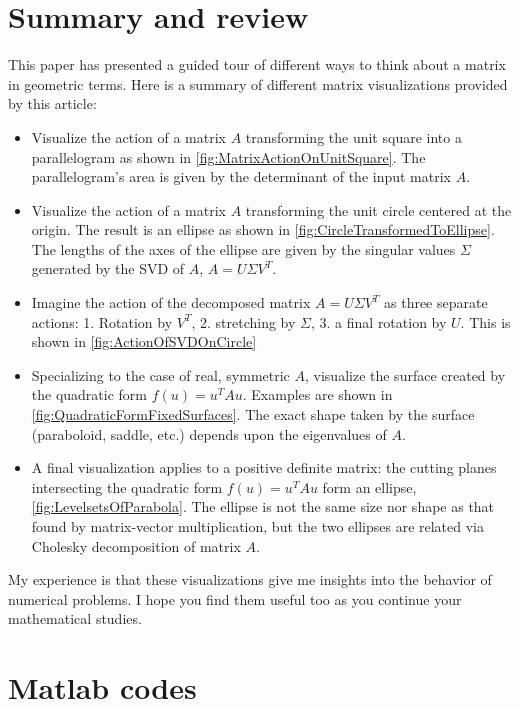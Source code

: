 \documentclass[onefignum,onetabnum]{siamart190516}
\begin{document}
\section{Summary and review}
This paper has presented a guided tour of different ways to think about
a matrix in geometric terms.  Here is a summary of different matrix visualizations
provided by this article:
\begin{itemize}
\item Visualize the action of a matrix $A$ transforming the unit square 
into a parallelogram as shown in \cref{fig:MatrixActionOnUnitSquare}.  
The parallelogram's area is given
by the determinant of the input matrix $A$.  

\item Visualize the action of a matrix $A$ transforming the unit circle centered at the
origin.  The result is an ellipse as shown in \cref{fig:CircleTransformedToEllipse}.  
The lengths of the axes of the ellipse 
are given by the singular values $\Sigma$ generated by the SVD of $A$, $A = U \Sigma V^T$.

\item Imagine the action of the decomposed matrix $A = U \Sigma V^T$ as three separate
actions: 1.  Rotation by $V^T$, 2.  stretching by $\Sigma$, 3.   a final rotation by $U$.
This is shown in \cref{fig:ActionOfSVDOnCircle}

\item Specializing to the case of real, symmetric $A$, visualize the
surface created by the quadratic form $f(u) = u^T A u$.  Examples are shown in 
\cref{fig:QuadraticFormFixedSurfaces}.  The exact shape taken
by the surface (paraboloid, saddle, etc.) depends upon the eigenvalues of $A$.

\item A final visualization applies to a positive definite matrix:  the
 cutting planes intersecting the quadratic form $f(u) = u^T A u$ form an ellipse,
\cref{fig:LevelsetsOfParabola}.  
The ellipse is not the same size nor shape as that found by 
matrix-vector multiplication, but the two ellipses are related via Cholesky decomposition of matrix $A$.
\end{itemize}
My experience is that these visualizations give me insights into the behavior
of numerical problems.  I hope you find them useful too as you continue
your mathematical studies.

\appendix
\section{Matlab codes}
\end{document}
